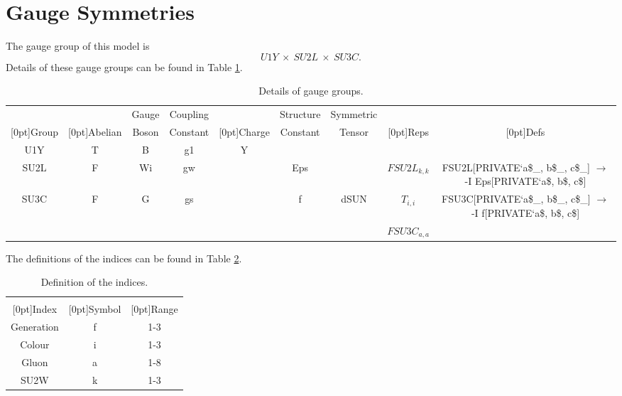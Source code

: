 \section{\label{symmetries}Gauge Symmetries}
The gauge group of this model is
\begin{equation}
U1Y\ \times\ SU2L\ \times\ SU3C.
\end{equation}
Details of these gauge groups can be found in Table \ref{tab:symmetries}.
\begin{table}[!h]
\begin{center}
\begin{tabular}{|c|c|c|c|c|c|c|c|c|}
\hline
 &  & Gauge & Coupling &  & Structure & Symmetric &  & \\
\raisebox{1.5ex}[0pt]{Group} & \raisebox{1.5ex}[0pt]{Abelian} & Boson & Constant & \raisebox{1.5ex}[0pt]{Charge} & Constant & Tensor & \raisebox{1.5ex}[0pt]{Reps} & \raisebox{1.5ex}[0pt]{Defs}\\
\hline\hline
U1Y & T & B & g1 & Y &  &  & & \\
SU2L & F & Wi & gw &  & Eps &  & $FSU2L_{k,k}$ & FSU2L[PRIVATE`a\$\_, b\$\_, c\$\_] $\rightarrow$ -I Eps[PRIVATE`a\$, b\$, c\$]\\
SU3C & F & G & gs &  & f & dSUN & $T_{i,i}$ & FSU3C[PRIVATE`a\$\_, b\$\_, c\$\_] $\rightarrow$ -I f[PRIVATE`a\$, b\$, c\$]\\
 &&&&&& & $FSU3C_{a,a}$ & \\
\hline
\end{tabular}
\caption[Gauge Groups]{\label{tab:symmetries}Details of gauge groups.}
\end{center}
\end{table}

The definitions of the indices can be found in Table \ref{tab:indices}.
\begin{table}[!h]
\begin{center}
\begin{tabular}{|c|c|c|}
\hline
 &  & \\
\raisebox{1.5ex}[0pt]{Index} & \raisebox{1.5ex}[0pt]{Symbol} & \raisebox{1.5ex}[0pt]{Range}\\
\hline\hline
Generation & f & 1-3\\
Colour & i & 1-3\\
Gluon & a & 1-8\\
SU2W & k & 1-3\\
\hline
\end{tabular}
\caption[Indices]{\label{tab:indices}Definition of the indices.}
\end{center}
\end{table}
\clearpage
